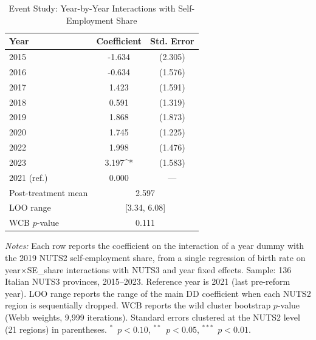 \begin{table}[t]
\centering
\caption{Event Study: Year-by-Year Interactions with Self-Employment Share}
\label{tab:event}
\small
\begin{tabular}{lcc}
\toprule
Year & Coefficient & Std. Error \\
\midrule
2015 & -1.634 & (2.305) \\
2016 & -0.634 & (1.576) \\
2017 & 1.423 & (1.591) \\
2018 & 0.591 & (1.319) \\
2019 & 1.868 & (1.873) \\
2020 & 1.745 & (1.225) \\
2022 & 1.998 & (1.476) \\
2023 & 3.197^{*} & (1.583) \\
2021 (ref.) & 0.000 & --- \\
\midrule
Post-treatment mean & \multicolumn{2}{c}{2.597} \\
LOO range & \multicolumn{2}{c}{[3.34, 6.08]} \\
WCB $p$-value & \multicolumn{2}{c}{0.111} \\
\bottomrule
\end{tabular}
\par\vspace{0.3em}\begin{flushleft}\small
\textit{Notes:} Each row reports the coefficient on the interaction of a year dummy with the 2019 NUTS2 self-employment share, from a single regression of birth rate on year$\times$SE\_share interactions with NUTS3 and year fixed effects. Sample: 136 Italian NUTS3 provinces, 2015--2023. Reference year is 2021 (last pre-reform year). LOO range reports the range of the main DD coefficient when each NUTS2 region is sequentially dropped. WCB reports the wild cluster bootstrap $p$-value (Webb weights, 9,999 iterations). Standard errors clustered at the NUTS2 level (21 regions) in parentheses. $^{*}$~$p<0.10$, $^{**}$~$p<0.05$, $^{***}$~$p<0.01$.
\end{flushleft}
\end{table}
